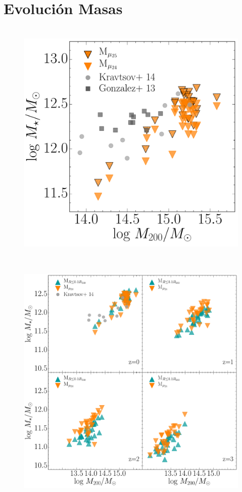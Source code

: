
\section{Evoluci\'on Masas}

\begin{figure}[H]
\centering
\includegraphics[height=12cm,width=12cm]{Figures/LR/Mbcg_vs_M200.pdf}
\caption[mbcg]{}
\label{fig:mbcg}
\end{figure}

\begin{figure}[H]
\centering
\includegraphics[height=12cm,width=12cm]{Figures/LR/muvs10r.pdf}
\caption[muvs10r500]{}
\label{fig:muvs10r500}
\end{figure}

